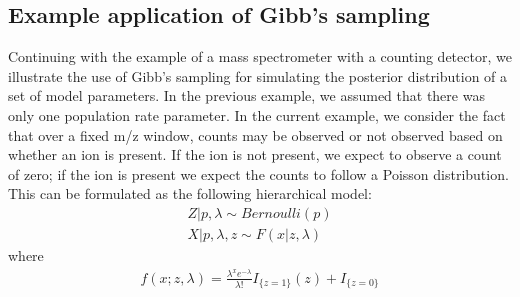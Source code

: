 \begin{DoubleSpace*}
\subsection{Example application of Gibb's sampling}
Continuing with the example of a mass spectrometer with a counting detector, we illustrate the use of Gibb's sampling for simulating the posterior distribution of a set of model parameters. In the previous example, we assumed that there was only one population rate parameter. In the current example, we consider the fact that over a fixed m/z window, counts may be observed or not observed based on whether an ion is present. If the ion is not present, we expect to observe a count of zero; if the ion is present we expect the counts to follow a Poisson distribution. This can be formulated as the following hierarchical model:
\begin{align}
	Z|p,\lambda \sim Bernoulli(p) \\
	X|p,\lambda,z \sim F(x|z,\lambda)
\end{align}
where
\begin{align}
f(x; z, \lambda) =\frac{\lambda^x e^{-\lambda}}{\lambda!} I_{\{z=1\}}(z)+ I_{\{z=0\}}
\end{align}
\end{DoubleSpace*}